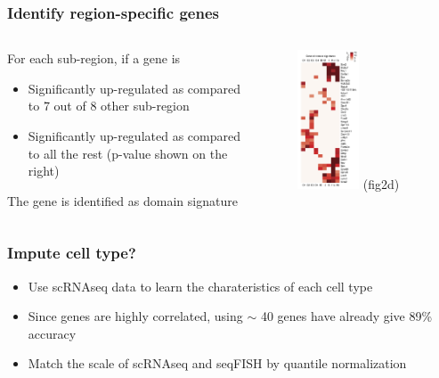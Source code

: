 \documentclass{beamer}
\begin{document}
  \begin{frame}
  \frametitle{Identify region-specific genes}
  \begin{columns}
  \begin{column}{0.4\textwidth}
    For each sub-region, if a gene is
    \begin{itemize}
      \item Significantly up-regulated as compared to 7 out of 8 other sub-region
      \item Significantly up-regulated as compared to all the rest (p-value shown on the right)
    \end{itemize}
    The gene is identified as domain signature
  \end{column}
  \begin{column}{0.6\textwidth}  %
    \begin{figure}
      \centering
      \includegraphics[width=0.5\textwidth]{sig_gene} (fig2d)
    \end{figure}
  \end{column}
  \end{columns}
  \end{frame}

  \begin{frame}
  \frametitle{Impute cell type?}
  \begin{itemize}
    \item Use scRNAseq data to learn the charateristics of each cell type
    \item Since genes are highly correlated, using $\sim$ 40 genes have already give 89\% accuracy
    \item Match the scale of scRNAseq and seqFISH by quantile normalization
  \end{itemize}
  \end{frame}
\end{document}
